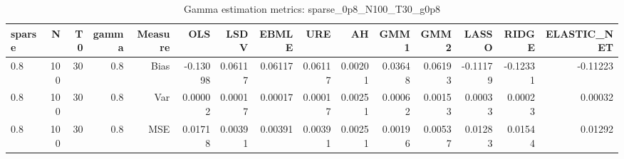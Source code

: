 \begin{table}[!htbp]\centering
\caption{Gamma estimation metrics: sparse_0p8_N100_T30_g0p8}
\label{tab:table1_sparse_0p8_N100_T30_g0p8}
\begin{tabular}{lrrrrrrrrrrrrrr}
\hline
sparse & N & T0 & gamma & Measure & OLS & LSDV & EBMLE & URE & AH & GMM1 & GMM2 & LASSO & RIDGE & ELASTIC_NET \\
\hline
0.8 & 100 & 30 & 0.8 & Bias & -0.13098 & 0.06117 & 0.06117 & 0.06117 & 0.00201 & 0.03648 & 0.06193 & -0.11179 & -0.12331 & -0.11223 \\
0.8 & 100 & 30 & 0.8 & Var & 0.00002 & 0.00017 & 0.00017 & 0.00017 & 0.00251 & 0.00062 & 0.00153 & 0.00033 & 0.00023 & 0.00032 \\
0.8 & 100 & 30 & 0.8 & MSE & 0.01718 & 0.00391 & 0.00391 & 0.00391 & 0.00251 & 0.00196 & 0.00537 & 0.01283 & 0.01544 & 0.01292 \\
\hline
\end{tabular}
\end{table}

